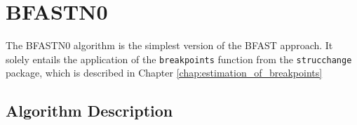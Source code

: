 \documentclass[main.tex]{subfiles}
\begin{document}
\chapter{BFASTN0}
\label{chap:bfast0n}
The BFASTN0 algorithm is the simplest version of the BFAST approach. It solely entails
the application of the \texttt{breakpoints} function from the
\texttt{strucchange} package, which is described in Chapter \ref{chap:estimation_of_breakpoints}
\section{Algorithm Description}
\label{sec:bfast0n_desc}


\biblio
\end{document}
